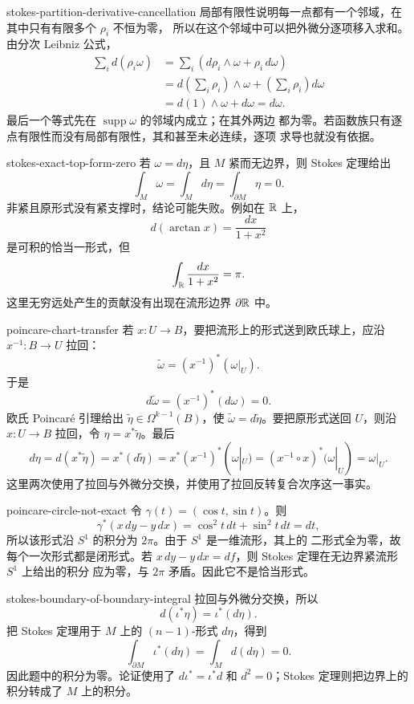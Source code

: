 \begin{solution}{stokes-partition-derivative-cancellation}
局部有限性说明每一点都有一个邻域，在其中只有有限多个 $\rho_i$ 不恒为零，
所以在这个邻域中可以把外微分逐项移入求和。由分次 Leibniz 公式，
\begin{align*}
 \sum_i d(\rho_i\omega)
 &=\sum_i(d\rho_i\wedge\omega+\rho_i\,d\omega)\\
 &=d\left(\sum_i\rho_i\right)\wedge\omega
   +\left(\sum_i\rho_i\right)d\omega\\
 &=d(1)\wedge\omega+d\omega=d\omega.
\end{align*}
最后一个等式先在 $\operatorname{supp}\omega$ 的邻域内成立；在其外两边
都为零。若函数族只有逐点有限性而没有局部有限性，其和甚至未必连续，逐项
求导也就没有依据。
\end{solution}

\begin{solution}{stokes-exact-top-form-zero}
若 $\omega=d\eta$，且 $M$ 紧而无边界，则 Stokes 定理给出
\[
 \int_M\omega=\int_Md\eta=\int_{\partial M}\eta=0.
\]
非紧且原形式没有紧支撑时，结论可能失败。例如在 $\mathbb{R}$ 上，
\[
 d(\arctan x)=\frac{dx}{1+x^2}
\]
是可积的恰当一形式，但
\[
 \int_{\mathbb{R}}\frac{dx}{1+x^2}=\pi.
\]
这里无穷远处产生的贡献没有出现在流形边界 $\partial\mathbb{R}$ 中。
\end{solution}

\begin{solution}{poincare-chart-transfer}
若 $x:U\to B$，要把流形上的形式送到欧氏球上，应沿
$x^{-1}:B\to U$ 拉回：
\[
 \widetilde\omega=(x^{-1})^*(\omega|_U).
\]
于是
\[
 d\widetilde\omega=(x^{-1})^*(d\omega)=0.
\]
欧氏 Poincaré 引理给出
$\widetilde\eta\in\Omega^{k-1}(B)$，使
$\widetilde\omega=d\widetilde\eta$。要把原形式送回 $U$，则沿
$x:U\to B$ 拉回，令 $\eta=x^*\widetilde\eta$。最后
\[
 d\eta=d(x^*\widetilde\eta)
 =x^*(d\widetilde\eta)
 =x^*(x^{-1})^*(\omega|_U)
 =(x^{-1}\circ x)^*(\omega|_U)
 =\omega|_U.
\]
这里两次使用了拉回与外微分交换，并使用了拉回反转复合次序这一事实。
\end{solution}

\begin{solution}{poincare-circle-not-exact}
令 $\gamma(t)=(\cos t,\sin t)$。则
\[
 \gamma^*(x\,dy-y\,dx)
 =\cos^2t\,dt+\sin^2t\,dt=dt,
\]
所以该形式沿 $S^1$ 的积分为 $2\pi$。由于 $S^1$ 是一维流形，其上的
二形式全为零，故每个一次形式都是闭形式。若
$x\,dy-y\,dx=df$，则 Stokes 定理在无边界紧流形 $S^1$ 上给出的积分
应为零，与 $2\pi$ 矛盾。因此它不是恰当形式。
\end{solution}

\begin{solution}{stokes-boundary-of-boundary-integral}
拉回与外微分交换，所以
\[
 d(\iota^*\eta)=\iota^*(d\eta).
\]
把 Stokes 定理用于 $M$ 上的 $(n-1)$-形式 $d\eta$，得到
\[
 \int_{\partial M}\iota^*(d\eta)
 =\int_Md(d\eta)=0.
\]
因此题中的积分为零。论证使用了
$d\iota^*=\iota^*d$ 和 $d^2=0$；Stokes 定理则把边界上的积分转成了
$M$ 上的积分。
\end{solution}


